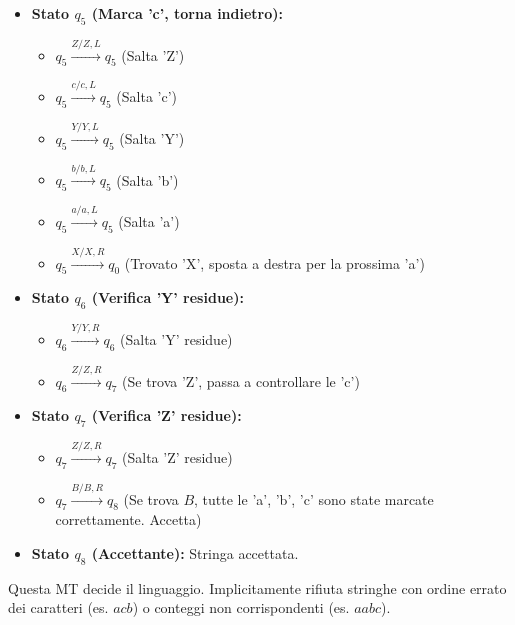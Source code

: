 \documentclass[a4paper]{article}
\begin{document}
\begin{itemize}
\begin{itemize}
        \end{itemize}
    \item \textbf{Stato $q_5$ (Marca 'c', torna indietro):}
        \begin{itemize}
            \item $q_5 \xrightarrow{Z / Z, L} q_5$ (Salta 'Z')
            \item $q_5 \xrightarrow{c / c, L} q_5$ (Salta 'c')
            \item $q_5 \xrightarrow{Y / Y, L} q_5$ (Salta 'Y')
            \item $q_5 \xrightarrow{b / b, L} q_5$ (Salta 'b')
            \item $q_5 \xrightarrow{a / a, L} q_5$ (Salta 'a')
            \item $q_5 \xrightarrow{X / X, R} q_0$ (Trovato 'X', sposta a destra per la prossima 'a')
        \end{itemize}
    \item \textbf{Stato $q_6$ (Verifica 'Y' residue):}
        \begin{itemize}
            \item $q_6 \xrightarrow{Y / Y, R} q_6$ (Salta 'Y' residue)
            \item $q_6 \xrightarrow{Z / Z, R} q_7$ (Se trova 'Z', passa a controllare le 'c')
        \end{itemize}
    \item \textbf{Stato $q_7$ (Verifica 'Z' residue):}
        \begin{itemize}
            \item $q_7 \xrightarrow{Z / Z, R} q_7$ (Salta 'Z' residue)
            \item $q_7 \xrightarrow{B / B, R} q_8$ (Se trova $B$, tutte le 'a', 'b', 'c' sono state marcate correttamente. Accetta)
        \end{itemize}
    \item \textbf{Stato $q_8$ (Accettante):} Stringa accettata.
\end{itemize}
Questa MT decide il linguaggio. Implicitamente rifiuta stringhe con ordine errato dei caratteri (es. $acb$) o conteggi non corrispondenti (es. $aabc$).
\end{document}
